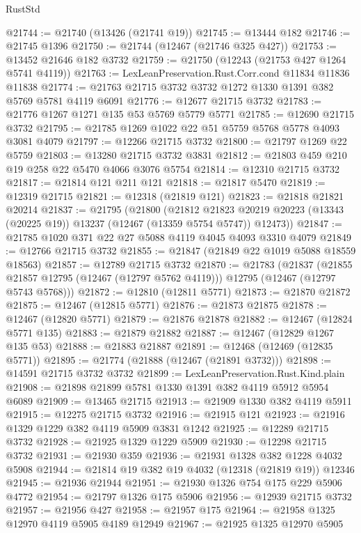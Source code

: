 \begin{lexlean}{RustStd}
\begin{coremodule}
@21744 := @21740 (@13426 (@21741 @19))
@21745 := @13444 @182
@21746 := @21745 @1396
@21750 := @21744 (@12467 (@21746 @325 @427))
@21753 := @13452 @21646 @182 @3732
@21759 := @21750 (@12243 (@21753 @427 @1264 @5741 @4119))
@21763 := LexLeanPreservation.Rust.Corr.cond @11834 @11836 @11838
@21774 := @21763 @21715 @3732 @3732 @1272 @1330 @1391 @382 @5769 @5781 @4119 @6091
@21776 := @12677 @21715 @3732
@21783 := @21776 @1267 @1271 @135 @53 @5769 @5779 @5771
@21785 := @12690 @21715 @3732
@21795 := @21785 @1269 @1022 @22 @51 @5759 @5768 @5778 @4093 @3081 @4079
@21797 := @12266 @21715 @3732
@21800 := @21797 @1269 @22 @5759
@21803 := @13280 @21715 @3732 @3831
@21812 := @21803 @459 @210 @19 @258 @22 @5470 @4066 @3076 @5754
@21814 := @12310 @21715 @3732
@21817 := @21814 @121 @211 @121
@21818 := @21817 @5470
@21819 := @12319 @21715
@21821 := @12318 (@21819 @121)
@21823 := @21818 @21821 @20214
@21837 := @21795
    (@21800
      (@21812
        @21823
        @20219
        @20223
        (@13343 (@20225 @19))
        @13237
        (@12467 (@13359 @5754 @5747))
        @12473))
@21847 := @21785 @1020 @371 @22 @27 @5088 @4119 @4045 @4093 @3310 @4079
@21849 := @12766 @21715 @3732
@21855 := @21847 (@21849 @22 @1019 @5088 @18559 @18563)
@21857 := @12789 @21715 @3732
@21870 := @21783
    (@21837
      (@21855 @21857 @12795 (@12467 (@12797 @5762 @4119)))
      @12795
      (@12467 (@12797 @5743 @5768)))
@21872 := @12810 (@12811 @5771)
@21873 := @21870 @21872
@21875 := @12467 (@12815 @5771)
@21876 := @21873 @21875
@21878 := @12467 (@12820 @5771)
@21879 := @21876 @21878
@21882 := @12467 (@12824 @5771 @135)
@21883 := @21879 @21882
@21887 := @12467 (@12829 @1267 @135 @53)
@21888 := @21883 @21887
@21891 := @12468 (@12469 (@12835 @5771))
@21895 := @21774 (@21888 (@12467 (@21891 @3732)))
@21898 := @14591 @21715 @3732 @3732
@21899 := LexLeanPreservation.Rust.Kind.plain
@21908 := @21898 @21899 @5781 @1330 @1391 @382 @4119 @5912 @5954 @6089
@21909 := @13465 @21715
@21913 := @21909 @1330 @382 @4119 @5911
@21915 := @12275 @21715 @3732
@21916 := @21915 @121
@21923 := @21916 @1329 @1229 @382 @4119 @5909 @3831 @1242
@21925 := @12289 @21715 @3732
@21928 := @21925 @1329 @1229 @5909
@21930 := @12298 @21715 @3732
@21931 := @21930 @359
@21936 := @21931 @1328 @382 @1228 @4032 @5908
@21944 := @21814 @19 @382 @19 @4032 (@12318 (@21819 @19)) @12346
@21945 := @21936 @21944
@21951 := @21930 @1326 @754 @175 @229 @5906 @4772
@21954 := @21797 @1326 @175 @5906
@21956 := @12939 @21715 @3732
@21957 := @21956 @427
@21958 := @21957 @175
@21964 := @21958 @1325 @12970 @4119 @5905 @4189 @12949
@21967 := @21925 @1325 @12970 @5905

\end{coremodule}
\end{lexlean}
